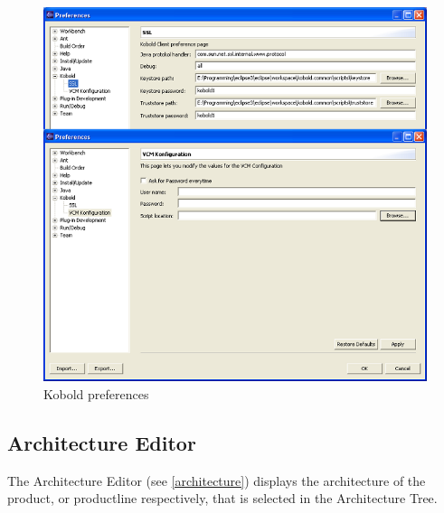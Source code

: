 \begin{figure}[h!]
\begin{center}
\includegraphics[width=17cm]{pref.png}
   \caption{Kobold preferences}
\label{pref}
\end{center}
\end{figure}\par



\subsection{Architecture Editor}

The Architecture Editor (see \ref{architecture}) displays the architecture of the product,
or productline respectively, that is selected in the Architecture Tree. \par

